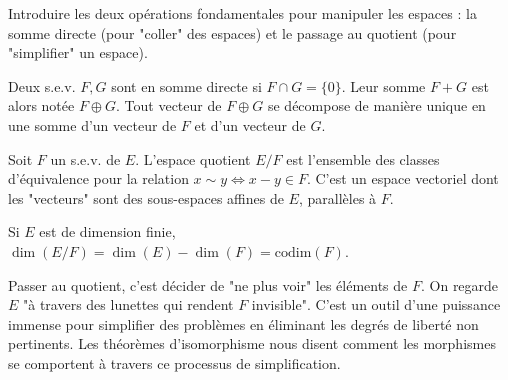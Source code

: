 \begin{objectif}
    Introduire les deux opérations fondamentales pour manipuler les espaces : la somme directe (pour "coller" des espaces) et le passage au quotient (pour "simplifier" un espace).
\end{objectif}

\begin{definition}
    Deux s.e.v. $F, G$ sont en somme directe si $F \cap G = \{0\}$. Leur somme $F+G$ est alors notée $F \oplus G$. Tout vecteur de $F \oplus G$ se décompose de manière unique en une somme d'un vecteur de $F$ et d'un vecteur de $G$.
\end{definition}

\begin{definition}
    Soit $F$ un s.e.v. de $E$. L'espace quotient $E/F$ est l'ensemble des classes d'équivalence pour la relation $x \sim y \iff x-y \in F$. C'est un espace vectoriel dont les "vecteurs" sont des sous-espaces affines de $E$, parallèles à $F$.
\end{definition}

\begin{proposition}
    Si $E$ est de dimension finie, $\dim(E/F) = \dim(E) - \dim(F) = \mathrm{codim}(F)$.
\end{proposition}

\begin{remark}
    Passer au quotient, c'est décider de "ne plus voir" les éléments de $F$. On regarde $E$ "à travers des lunettes qui rendent $F$ invisible". C'est un outil d'une puissance immense pour simplifier des problèmes en éliminant les degrés de liberté non pertinents. Les théorèmes d'isomorphisme nous disent comment les morphismes se comportent à travers ce processus de simplification.
\end{remark}